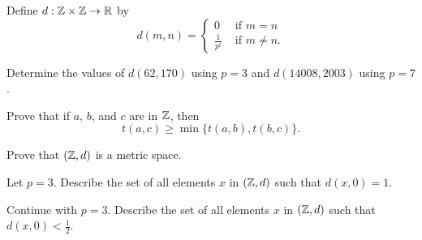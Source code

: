 {Define $d: \mathbb{Z} \times \mathbb{Z} \to \mathbb{R}$ by 
\[d(m,n) = \begin{cases} 0 &\text{ if } m=n \\ \frac{1}{p^t} &\text{ if } m \neq n. \end{cases}\] 


\ba

\item Determine the values of $d(62,170)$ using $p=3$ and $d(14008,2003)$ using $p=7$. 

\item Prove that if $a$, $b$, and $c$ are in $\mathbb{Z}$, then 
\[t(a,c) \geq \min\{t(a,b), t(b,c)\}.\]

\item Prove that $(\mathbb{Z},d)$ is a metric space.

\item Let $p = 3$. Describe the set of all elements $x$ in $(\mathbb{Z},d)$ such that $d(x,0) = 1$. 

\item Continue with $p=3$. Describe the set of all elements $x$ in $(\mathbb{Z},d)$ such that $d(x,0) < \frac{1}{2}$.

\ea

\begin{comment}

\ExerciseSolution

\ba

\item With $p=3$ we have $170-62 = 108 = 4 \times 3^3$, so $t(62,170) = 3$. This makes $d(62,170) = \frac{1}{27}$.  

With $p=7$, we have $14008-2003 = 12005 = 5 \times 7^4$, so $t(2003,14008) = 4$. This makes $d(14008,2003) = \frac{1}{7^4}$. 

\item Let $p$ be prime and let $a$, $b$, and $c$ be in $\Z$. We have that 
\[a-c = k_1p^{t(a,c)}, \ a-b = k_2p^{t(a,b)}, \ \text{ and } \ b-c = k_3p^{t(b,c)}\]
for some integers $k_1$, $k_2$, and $k_3$ that are not divisible by $p$. Then
\[k_1p^{t(a,c)} = a-c = (a-b) + (b-c) = k_2p^{t(a,b)} +  k_3p^{t(b,c)}.\]
We consider the cases where $t(a,b) \leq t(b,c)$ and $t(a,b) > t(b,c)$.
\begin{description}
\item[Case 1: $t(a,b) \leq t(b,c)$.] Then $\min\{t(a,b), t(b,c)\} = t(a,b)$. It follows that
\[a-c = k_2p^{t(a,b)} +  k_3p^{t(b,c)} = p^{t(a,b)}\left(k_2 + k_3p^{t(b,c) - t(a,b)}\right)\]
and so $p^{t(a,b)}$ divides $a-c$. This makes $t(a,c) \geq t(a,b)$. 
\item[Case 2: $t(a,b) < t(b,c)$.] Then $\min\{t(a,b), t(b,c)\} = t(b,c)$. It follows that
\[a-c = k_2p^{t(a,b)} +  k_3p^{t(b,c)} = p^{t(b,c)}\left(k_3p^{t(a,b) - t(b,c)} + k_3\right)\]
and so $p^{t(b,c)}$ divides $a-c$. This makes $t(a,c) \geq t(b,c)$. 
\end{description}
In either case we have $t(a,c) \geq \min\{t(a,b), t(b,c)\}$. 



\end{comment}}
